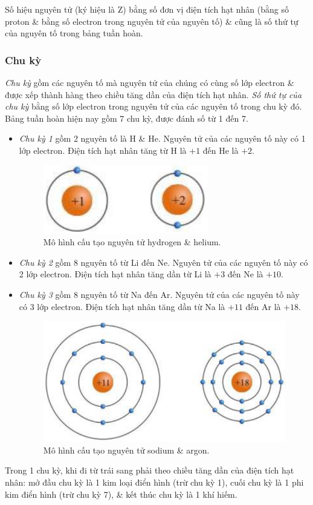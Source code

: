 \documentclass{article}
\begin{document}
Số hiệu nguyên tử (ký hiệu là Z) bằng số đơn vị điện tích hạt nhân (bằng số proton \& bằng số electron trong nguyên tử của nguyên tố) \& cũng là số thứ tự của nguyên tố trong bảng tuần hoàn.

\subsubsection{Chu kỳ}
\textit{Chu kỳ} gồm các nguyên tố mà nguyên tử của chúng có cùng số lớp electron \& được xếp thành hàng theo chiều tăng dần của điện tích hạt nhân. \textit{Số thứ tự của chu kỳ} bằng số lớp electron trong nguyên tử của các nguyên tố trong chu kỳ đó. Bảng tuần hoàn hiện nay gồm 7 chu kỳ, được đánh số từ 1 đến 7.
\begin{itemize}
	\item \textit{Chu kỳ 1} gồm 2 nguyên tố là H \& He. Nguyên tử của các nguyên tố này có 1 lớp electron. Điện tích hạt nhân tăng từ H là $+1$ đến He là $+2$.
	\begin{figure}[H]
		\centering
		\includegraphics[scale=0.3]{hydrogen_helium}
		\caption{Mô hình cấu tạo nguyên tử hydrogen \& helium.}
	\end{figure}
	\item \textit{Chu kỳ 2} gồm 8 nguyên tố từ Li đến Ne. Nguyên tử của các nguyên tố này có 2 lớp electron. Điện tích hạt nhân tăng dần từ Li là $+3$ đến Ne là $+10$.
	\item \textit{Chu kỳ 3} gồm 8 nguyên tố từ Na đến Ar. Nguyên tử của các nguyên tố này có 3 lớp electron. Điện tích hạt nhân tăng dần từ Na là $+11$ đến Ar là $+18$.
	\begin{figure}[H]
		\centering
		\includegraphics[scale=0.3]{sodium_argon}
		\caption{Mô hình cấu tạo nguyên tử sodium \& argon.}
	\end{figure}
\end{itemize}
Trong 1 chu kỳ, khi đi từ trái sang phải theo chiều tăng dần của điện tích hạt nhân: mở đầu chu kỳ là 1 kim loại điển hình (trừ chu kỳ 1), cuối chu kỳ là 1 phi kim điển hình (trừ chu kỳ 7), \& kết thúc chu kỳ là 1 khí hiếm.
\end{document}
